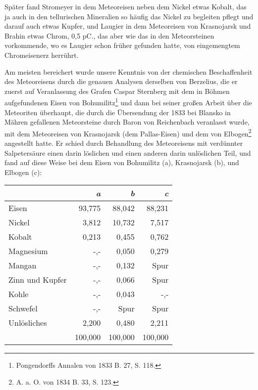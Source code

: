 \documentclass[a4paper, 11pt, oneside]{article}
\begin{document}
Später fand Stromeyer in dem Meteoreisen neben dem Nickel etwas Kobalt, das ja auch in den tellurischen Mineralien so häufig das Nickel zu begleiten pflegt und darauf auch etwas Kupfer, und Laugier in dem Meteoreisen von Krasnojarsk und Brahin etwas Chrom, 0,5 pC., das aber wie das in den Meteorsteinen vorkommende, wo es Laugier schon früher gefunden hatte, von eingemengtem Chromeisenerz herrührt.

Am meisten bereichert wurde unsere Kenntnis von der chemischen Beschaffenheit des Meteoreisens durch die genauen Analysen derselben von Berzelius, die er zuerst auf Veranlassung des Grafen Caspar Sternberg mit dem in Böhmen aufgefundenen Eisen von Bohumilitz\footnote{Pongendorffs Annalen von 1833 B. 27, S. 118.} und dann bei seiner großen Arbeit über die Meteoriten überhaupt, die durch die Übersendung der 1833 bei Blansko in Mähren gefallenen Meteorsteine durch Baron von Reichenbach veranlasst wurde, mit dem Meteoreisen von Krasnojarsk (dem Pallas-Eisen) und dem von Elbogen\footnote{A. a. O. von 1834 B. 33, S. 123.} angestellt hatte. Er schied durch Behandlung des Meteoreisens mit verdünnter Salpetersäure einen darin löslichen und einen anderen darin unlöslichen Teil, und fand auf diese Weise bei dem Eisen von Bohumilitz (a), Krasnojarsk (b), und Elbogen (c):
\begin{center}
\begin{tabular}{ |l|r|r|r| }
    \hline
     & \emph{a} & \emph{b} & \emph{c}\\
    \hline\hline
    Eisen & 93,775 & 88,042 & 88,231\\\hline
    Nickel & 3,812 & 10,732 & 7,517\\\hline
    Kobalt & 0,213 & 0,455 & 0,762\\\hline
    Magnesium & -,- & 0,050 & 0,279\\\hline
    Mangan & -,- & 0,132 & Spur\\\hline
    Zinn und Kupfer & -,- & 0,066 & Spur\\\hline
    Kohle & -,- & 0,043 & -,-\\\hline
    Schwefel & -,- & Spur & Spur\\\hline
    Unlösliches & 2,200 & 0,480 & 2,211\\\hline
    & 100,000 & 100,000 & 100,000\\
    \hline
\end{tabular}
\end{center}
\end{document}
